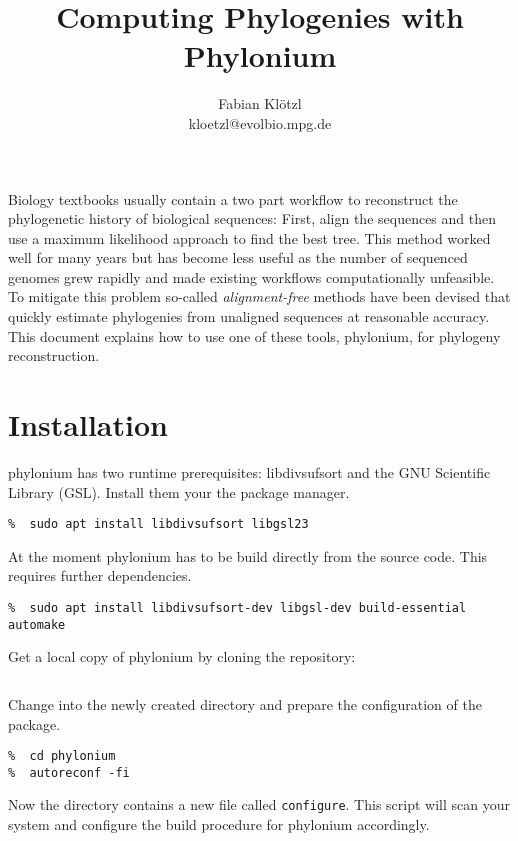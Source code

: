\documentclass[a4paper,10pt,english]{scrartcl}
\title{Computing Phylogenies with Phylonium}
\author{Fabian Klötzl\\\normalsize{kloetzl@evolbio.mpg.de}}
\date{\isodate{\today}}
\newcommand{\tool}[1]{\textsf{#1}}
\newcommand{\phylonium}{\textsf{phylonium}\xspace}
\begin{document}
\frenchspacing
\maketitle


Biology textbooks usually contain a two part workflow to reconstruct the phylogenetic history of biological sequences: %
First, align the sequences and then use a maximum likelihood approach to find the best tree. This method worked well for many years but has become less useful as the number of sequenced genomes grew rapidly and made existing workflows computationally unfeasible. To mitigate this problem so-called \emph{alignment-free} methods have been devised that quickly estimate phylogenies from unaligned sequences at reasonable accuracy. This document explains how to use one of these tools, \phylonium, for phylogeny reconstruction. 

\section{Installation}

\phylonium has two runtime prerequisites: \tool{libdivsufsort} and the \tool{GNU Scientific Library} (GSL). Install them your the package manager.

\begin{lstlisting}
%  sudo apt install libdivsufsort libgsl23
\end{lstlisting}

At the moment \phylonium has to be build directly from the source code. This requires further dependencies.

\begin{lstlisting}
%  sudo apt install libdivsufsort-dev libgsl-dev build-essential automake
\end{lstlisting}

Get a local copy of \phylonium by cloning the repository:

\begin{lstlisting}[language=bash]
%  git clone https://github.com/kloetzl/phylonium
\end{lstlisting}

Change into the newly created directory and prepare the configuration of the package.

\begin{lstlisting}
%  cd phylonium
%  autoreconf -fi
\end{lstlisting}

Now the directory contains a new file called \lstinline!configure!. This script will scan your system and configure the build procedure for \phylonium accordingly.
\end{document}
